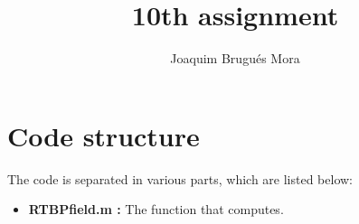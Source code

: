\documentclass[twoside]{article}
\begin{document}
\title{10th assignment}
\author{Joaquim Brugués Mora}
\maketitle

\section{Code structure}

The code is separated in various parts, which are listed below:

\begin{itemize}
\item {\bf RTBPfield.m :} The function that computes.
\end{itemize}
\end{document}
